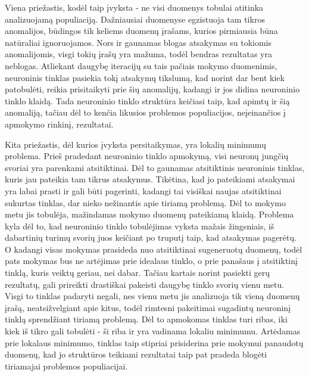 \documentclass{VUMIFPSbakalaurinis}
\begin{document}
Viena priežastis, kodėl taip įvyksta - ne visi duomenys tobulai atitinka analizuojamą populiaciją.
Dažniausiai duomenyse egzistuoja tam tikros anomalijos, būdingos tik keliems duomenų įrašams, kurios pirmiausia būna natūraliai ignoruojamos.
Nors ir gaunamas blogas atsakymas su tokiomis anomalijomis, visgi tokių įrašų yra mažuma, todėl bendras rezultatas yra neblogas.
Atliekant daugybę iteracijų su tais pačiais mokymo duomenimis, neuroninis tinklas pasiekia tokį atsakymų tikslumą, kad norint dar bent kiek patobulėti, reikia prisitaikyti prie šių anomalijų, kadangi ir jos didina neuroninio tinklo klaidą.
Tada neuroninio tinklo struktūra keičiasi taip, kad apimtų ir šią anomaliją, tačiau dėl to kenčia likusios problemos populiacijos, neįeinančios į apmokymo rinkinį, rezultatai.

Kita priežastis, dėl kurios įvyksta persitaikymas, yra lokalių minimumų problema.
Prieš pradedant neuroninio tinklo apmokymą, visi neuronų jungčių svoriai yra parenkami atsitiktinai.
Dėl to gaunamas atsitiktinis neuroninis tinklas, kuris jau pateikia tam tikrus atsakymus.
Tikėtina, kad jo pateikiami atsakymai yra labai prasti ir gali būti pagerinti, kadangi tai visiškai naujas atsitiktinai sukurtas tinklas, dar nieko nežinantis apie tiriamą problemą.
Dėl to mokymo metu jis tobulėja, mažindamas mokymo duomenų pateikiamą klaidą.
Problema kyla dėl to, kad neuroninio tinklo tobulėjimas vyksta mažais žingsniais, iš dabartinių turimų svorių juos keičiant po truputį taip, kad atsakymas pagerėtų.
O kadangi visas mokymas prasideda nuo atsitiktinai sugeneruotų duomenų, todėl pats mokymas bus ne artėjimas prie idealaus tinklo, o prie panašaus į atsitiktinį tinklą, kuris veiktų geriau, nei dabar.
Tačiau kartais norint pasiekti gerų rezultatų, gali prireikti drastiškai pakeisti daugybę tinklo svorių vienu metu.
Visgi to tinklas padaryti negali, nes vienu metu jis analizuoja tik vieną duomenų įrašą, neatsižvelgiant apie kitus, todėl rimtesni pakeitimai sugadintų neuroninį tinklą sprendžiant tiriamą problemą.
Dėl to apmokomas tinklas turi ribas, iki kiek iš tikro gali tobulėti - ši riba ir yra vadinama lokaliu minimumu.
Artėdamas prie lokalaus minimumo, tinklas taip stipriai prisiderina prie mokymui panaudotų duomenų, kad jo struktūros teikiami rezultatai taip pat pradeda blogėti tiriamajai problemos populiacijai.
\end{document}
